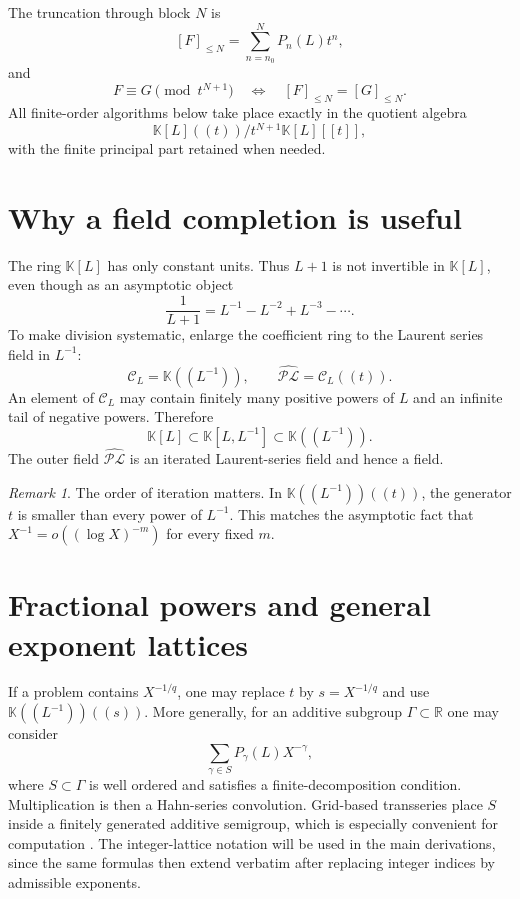 \documentclass[11pt,oneside]{book}
\theoremstyle{definition}
\theoremstyle{remark}
\newtheorem{remark}[theorem]{Remark}
\newcommand{\K}{\mathbb K}
\newcommand{\R}{\mathbb R}
\newcommand{\PLfield}{\widehat{\mathscr{PL}}}
\newcommand{\trunc}[2]{\left[#1\right]_{\le #2}}
\begin{document}
The truncation through block $N$ is
\[
 \trunc{F}{N}=\sum_{n=n_0}^{N}P_n(L)t^n,
\]
and
\[
 F\equiv G\pmod{t^{N+1}}
 \quad\Longleftrightarrow\quad
 \trunc{F}{N}=\trunc{G}{N}.
\]
All finite-order algorithms below take place exactly in the quotient algebra
\[
 \K[L]((t))/t^{N+1}\K[L][[t]],
\]
with the finite principal part retained when needed.

\section{Why a field completion is useful}
The ring $\K[L]$ has only constant units.  Thus $L+1$ is not invertible in
$\K[L]$, even though as an asymptotic object
\[
 \frac{1}{L+1}=L^{-1}-L^{-2}+L^{-3}-\cdots.
\]
To make division systematic, enlarge the coefficient ring to the Laurent
series field in $L^{-1}$:
\begin{equation}\label{eq:PL-field-def}
 \mathcal C_L=\K((L^{-1})),
 \qquad
 \PLfield=\mathcal C_L((t)).
\end{equation}
An element of $\mathcal C_L$ may contain finitely many positive powers of $L$
and an infinite tail of negative powers.  Therefore
\[
 \K[L]\subset\K[L,L^{-1}]\subset\K((L^{-1})).
\]
The outer field $\PLfield$ is an iterated Laurent-series field and hence a
field.

\begin{remark}
The order of iteration matters.  In $\K((L^{-1}))((t))$, the generator $t$ is
smaller than every power of $L^{-1}$.  This matches the asymptotic fact that
$X^{-1}=o((\log X)^{-m})$ for every fixed $m$.
\end{remark}

\section{Fractional powers and general exponent lattices}
If a problem contains $X^{-1/q}$, one may replace $t$ by $s=X^{-1/q}$ and use
$\K((L^{-1}))((s))$.  More generally, for an additive subgroup
$\Gamma\subset\R$ one may consider
\[
 \sum_{\gamma\in S}P_\gamma(L)X^{-\gamma},
\]
where $S\subset\Gamma$ is well ordered and satisfies a finite-decomposition
condition.  Multiplication is then a Hahn-series convolution.  Grid-based
transseries place $S$ inside a finitely generated additive semigroup, which is
especially convenient for computation \cite{EdgarBeginners,EdgarComposition}.
The integer-lattice notation will be used in the main derivations, since the
same formulas then extend verbatim after replacing integer indices by
admissible exponents.
\end{document}
